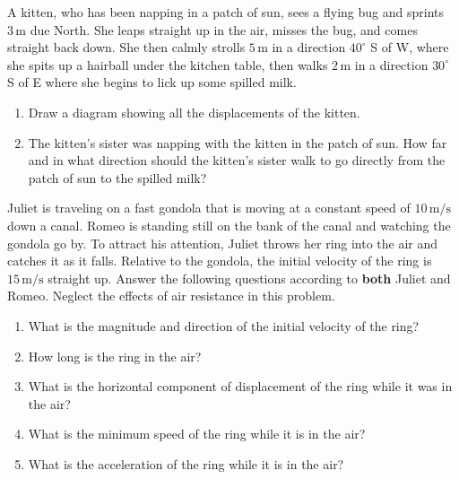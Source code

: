 \begin{exercise}  
  A kitten, who has been napping in a patch of sun, sees a flying bug
  and sprints $3\,\text{m}$ due North.  She leaps straight up in the
  air, misses the bug, and comes straight back down.  She then calmly
  strolls $5\,\text{m}$ in a direction $40^\circ$ S of W, where she
  spits up a hairball under the kitchen table, then walks $2\,\text{m}$
  in a direction $30^\circ$ S of E where she begins to lick up some
  spilled milk.
  \begin{enumerate}
  \item Draw a diagram showing all the displacements of the kitten.
  \item The kitten's sister was napping with the kitten in the patch
    of sun.  How far and in what direction should the kitten's sister
    walk to go directly from the patch of sun to the spilled milk?
  \end{enumerate}
\end{exercise}



\begin{exercise} 
  Juliet is traveling on a fast gondola that is moving at a constant
  speed of $10\,\text{m/s}$ down a canal.  Romeo is standing still on
  the bank of the canal and watching the gondola go by.  To attract
  his attention, Juliet throws her ring into the air and catches it as
  it falls.  Relative to the gondola, the initial velocity of the ring
  is $15\,\text{m/s}$ straight up.  Answer the following questions
  according to \textbf{both} Juliet and Romeo.  Neglect the effects of
  air resistance in this problem.
  \begin{enumerate}
  \item What is the magnitude and direction of the initial velocity of
    the ring?
  \item How long is the ring in the air?
  \item What is the horizontal component of displacement of the ring while
  it was in the air?
  \item What is the minimum speed of the ring while it is in the air?
  \item What is the acceleration of the ring while it is in the air?
  \end{enumerate}
\end{exercise}

